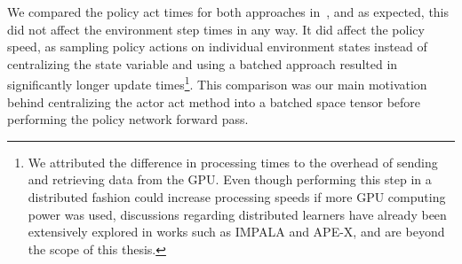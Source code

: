     We compared the policy act times for both approaches in~,
    and as expected, this did not affect the environment step times in any way.
    It did affect the policy speed, as sampling policy actions on individual environment states instead of
    centralizing the state variable and using a batched approach resulted in significantly longer update times\footnote{
        We attributed the difference in processing times to the overhead of sending and retrieving data from the GPU.
        Even though performing this step in a distributed fashion could increase processing speeds if more GPU computing power was used,
        discussions regarding distributed learners have already been extensively explored in works such as IMPALA and APE-X,
        and are beyond the scope of this thesis.
    }.
    This comparison was our main motivation behind centralizing the actor act method into a batched space tensor
    before performing the policy network forward pass.



